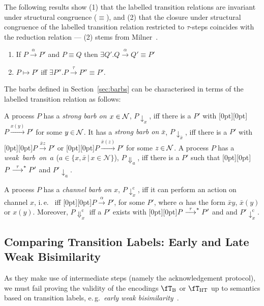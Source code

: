 \documentclass[runningheads]{llncs}
\newcommand{\sect}[1]{Section~\ref{sec:#1}}
\newcommand{\fTHT}{\fT_{\textrm{HT}}}       %
\newcommand{\N} {{\cal N}}               %
\newcommand{\plat}[1]{\raisebox{0pt}[0pt][0pt]{#1}}     %
\newcommand\ie{i.\,e.~}
\newcommand\eg{e.\,g.~}
\newcommand{\equred}{\mathrel{\equiv}}
\newcommand{\sbarb}[1]{{\downarrow_{#1}}}
\newcommand{\ocomm}[1]{{\Downarrow_{#1}}}
\newcommand{\ascomm}[1]{\downarrow^{\mathrm{c}}_{#1}}
\newcommand{\acomm}[1]{\Downarrow^{\mathrm{c}}_{#1}}
\begin{document}
The following results show (1) that the labelled transition relations are invariant under structural congruence ($\equred$), and (2)
that the closure under structural congruence of the
labelled transition relation restricted to $\tau$-steps coincides with
the reduction relation --- (2) stems from Milner~\cite{Mi92}.
\begin{lemma}\label{harmony}\rm
\begin{enumerate}
\item If $P \stackrel{\alpha}{\longrightarrow} P'$ and $P\equred Q$ then $\exists Q'. Q \stackrel{\alpha}{\longrightarrow} Q' \equred P'$%
\item $P \longmapsto P'$ iff $\exists P''. P \stackrel{\tau}{\longrightarrow} P'' \equred P'$.
\end{enumerate}
\end{lemma}
The barbs defined in \sect{barbs} can be characterised in terms of the labelled transition relation
as follows:
\begin{remark}
A process $P$ has a {\em strong barb on $x\in\N$}, $P \sbarb x$, iff there
is a $P'$ with \plat{$P \stackrel{x(y)}{\longrightarrow} P'$} for some $y\mathbin\in\N$.
It has a {\em strong barb on $\bar x$}, $P \sbarb {\bar x}$, iff there\vspace{1pt}
is a $P'$ with \plat{$P \stackrel{\bar x z}{\longrightarrow} P'$} or
\plat{$P \stackrel{\bar x(z)}{\longrightarrow} P'$} for some $z\mathbin\in\N$.
A process $P$ has a \mbox{\em weak barb on $a$}
($a \in \{ x, \bar x \,|\, x \in \mathcal N \}$), $P \ocomm a$, iff
there is a $P'$ such that \plat{$P \mathrel{\raisebox{0pt}[8pt][0pt]{$\stackrel{\tau}{\longrightarrow}$}^*} P'$} and
$P' \sbarb a$.

A process $P$ has a {\em channel barb on $x$}, $P \!\ascomm x$,
iff it can perform an action on channel $x$, \ie 
iff \plat{$P \stackrel{\alpha}{\longrightarrow} P'$},
for some $P'$, where $\alpha$ has the form $\bar{x}y$, $\bar{x}(y)$ or $x(y)$.
Moreover, $P\acomm x$ iff a $P'$ exists with \plat{$P \mathrel{\raisebox{0pt}[8pt][0pt]{$\stackrel{\tau}{\longrightarrow}$}^*} P'$} and
and $P' \!\ascomm x$.
\end{remark}

\subsection{Comparing Transition Labels: Early and Late Weak Bisimilarity}

As they make use of intermediate steps (namely the acknowledgement protocol), we must fail proving
the validity of the encodings $\fT_{\rm B}$ or $\fTHT$ up to semantics based on transition labels,
\eg {\em early weak bisimilarity}~\cite{SW01book}.
\end{document}

